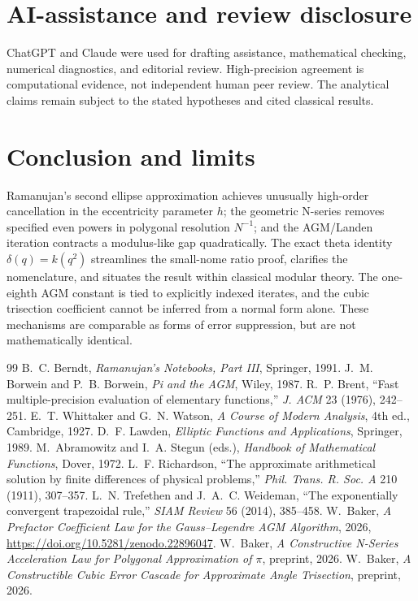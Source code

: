 \documentclass[11pt]{article}
\begin{document}
\section*{AI-assistance and review disclosure}
ChatGPT and Claude were used for drafting assistance, mathematical checking,
numerical diagnostics, and editorial review. High-precision agreement is
computational evidence, not independent human peer review. The analytical
claims remain subject to the stated hypotheses and cited classical results.
\section{Conclusion and limits}
Ramanujan's second ellipse approximation achieves unusually high-order cancellation in the eccentricity parameter $h$; the geometric N-series removes specified even powers in polygonal resolution $N^{-1}$; and the AGM/Landen iteration contracts a modulus-like gap quadratically. The exact theta identity $\delta(q)=k(q^2)$ streamlines the small-nome ratio proof, clarifies the nomenclature, and situates the result within classical modular theory. The one-eighth AGM constant is tied to explicitly indexed iterates, and the cubic trisection coefficient cannot be inferred from a normal form alone. These mechanisms are comparable as forms of error suppression, but are not mathematically identical.

\begin{thebibliography}{99}
 B.~C. Berndt, \emph{Ramanujan's Notebooks, Part III}, Springer, 1991.
 J.~M. Borwein and P.~B. Borwein, \emph{Pi and the AGM}, Wiley, 1987.
 R.~P. Brent, ``Fast multiple-precision evaluation of elementary functions,'' \emph{J. ACM} 23 (1976), 242--251.
 E.~T. Whittaker and G.~N. Watson, \emph{A Course of Modern Analysis}, 4th ed., Cambridge, 1927.
 D.~F. Lawden, \emph{Elliptic Functions and Applications}, Springer, 1989.
 M.~Abramowitz and I.~A. Stegun (eds.), \emph{Handbook of Mathematical Functions}, Dover, 1972.
 L.~F. Richardson, ``The approximate arithmetical solution by finite differences of physical problems,'' \emph{Phil. Trans. R. Soc. A} 210 (1911), 307--357.
 L.~N. Trefethen and J.~A.~C. Weideman, ``The exponentially convergent trapezoidal rule,'' \emph{SIAM Review} 56 (2014), 385--458.
 W.~Baker, \emph{A Prefactor Coefficient Law for the Gauss--Legendre AGM Algorithm}, 2026, \url{https://doi.org/10.5281/zenodo.22896047}.
 W.~Baker, \emph{A Constructive N-Series Acceleration Law for Polygonal Approximation of $\pi$}, preprint, 2026.
 W.~Baker, \emph{A Constructible Cubic Error Cascade for Approximate Angle Trisection}, preprint, 2026.
\end{thebibliography}
\end{document}
